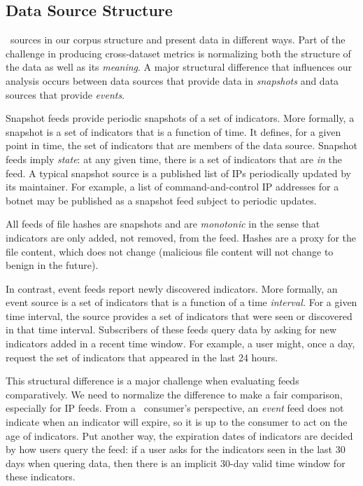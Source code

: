 
\subsection{Data Source Structure}
\label{sec:feed-structure}

\ti\ sources in our corpus structure and present data in different ways.
Part of the challenge in producing cross-dataset metrics is normalizing both
the structure of the data as well as its \emph{meaning}. A major structural
difference that influences our analysis occurs between data sources that
provide data in \emph{snapshots} and data sources that provide \emph{events}.

Snapshot feeds provide periodic snapshots of a set of indicators. More formally, a
snapshot is a set of indicators that is a function of time. It defines, for a given point in
time, the set of indicators that are members of the data source. Snapshot feeds imply
\emph{state}: at any given time, there is a set of indicators that are \emph{in} the feed.
A typical snapshot source is a published list of IPs periodically updated by its maintainer.
For example, a list of command-and-control IP addresses for a botnet may be published as a
snapshot feed subject to periodic updates.

All feeds of file hashes are snapshots and are \emph{monotonic} in the sense that indicators
are only added, not removed, from the feed. Hashes are a proxy for the file
content, which does not change (malicious file content will not change to benign in the future).

In contrast, event feeds report newly discovered indicators. More formally, an event source
is a set of indicators that is a function of a time \emph{interval.} For a given time interval,
the source provides a set of indicators that were seen or discovered in that time interval.
Subscribers of these feeds query data by asking for new indicators added in a recent time window.
For example, a user might, once a day, request the set of indicators that appeared
in the last 24 hours.

This structural difference is a major challenge when evaluating feeds comparatively.
We need to normalize the difference to make a fair comparison, especially for IP feeds. From a \ti\
consumer's perspective, an \emph{event} feed does not indicate when an indicator will
expire, so it is up to the consumer to act on the age of indicators. Put another way,
the expiration dates of indicators are decided by how users query the feed:
if a user asks for the indicators seen in the last 30 days
when quering data, then there is an implicit 30-day valid time window for these indicators.

